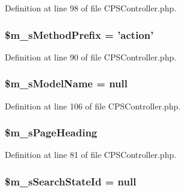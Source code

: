 Definition at line 98 of file CPSController.php.

\hypertarget{classCPSController_a00395af87aa1ea39a227b3ff7f822455}{
\subsubsection[{\$m\_\-sMethodPrefix}]{\setlength{\rightskip}{0pt plus 5cm}\$m\_\-sMethodPrefix = 'action'}}
\label{classCPSController_a00395af87aa1ea39a227b3ff7f822455}


Definition at line 90 of file CPSController.php.

\hypertarget{classCPSController_ac69f9415b98d14c89043029a9c2cb0cc}{
\subsubsection[{\$m\_\-sModelName}]{\setlength{\rightskip}{0pt plus 5cm}\$m\_\-sModelName = null}}
\label{classCPSController_ac69f9415b98d14c89043029a9c2cb0cc}


Definition at line 106 of file CPSController.php.

\hypertarget{classCPSController_a13d322a909191c149073cc615301d6c2}{
\subsubsection[{\$m\_\-sPageHeading}]{\setlength{\rightskip}{0pt plus 5cm}\$m\_\-sPageHeading}}
\label{classCPSController_a13d322a909191c149073cc615301d6c2}


Definition at line 81 of file CPSController.php.

\hypertarget{classCPSController_abf7a80aa37d98c6879fdeac9b9ed0dfd}{
\subsubsection[{\$m\_\-sSearchStateId}]{\setlength{\rightskip}{0pt plus 5cm}\$m\_\-sSearchStateId = null}}
\label{classCPSController_abf7a80aa37d98c6879fdeac9b9ed0dfd}


